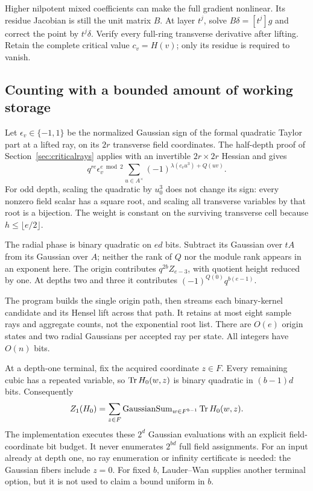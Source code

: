 Higher nilpotent mixed coefficients can make the full gradient nonlinear.
Its residue Jacobian is still the unit matrix $B$. At layer $t^j$, solve
$B\delta=[t^j]g$ and correct the point by $t^j\delta$. Verify every
full-ring transverse derivative after lifting. Retain the complete
critical value $c_v=H(v)$; only its residue is required to vanish.

\subsection{Counting with a bounded amount of working storage}
Let $\epsilon_v\in\{-1,1\}$ be the normalized Gaussian sign of the
formal quadratic Taylor part at a lifted ray, on its $2r$ transverse
field coordinates. The half-depth proof of Section~\ref{sec:criticalrays}
applies with an invertible $2r\times2r$ Hessian and gives
\[
 q^{re}\epsilon_v^{e\bmod2}
 \sum_{u\in A^\times}(-1)^{\lambda(c_vu^3)+Q(uv)}.
\]
For odd depth, scaling the quadratic by $u_0^3$ does not change its sign:
every nonzero field scalar has a square root, and scaling all transverse
variables by that root is a bijection. The weight is constant on the
surviving transverse cell because $h\le\lfloor e/2\rfloor$.

The radial phase is binary quadratic on $ed$ bits. Subtract its Gaussian
over $tA$ from its Gaussian over $A$; neither the rank of $Q$ nor the
module rank appears in an exponent here. The origin contributes
$q^{2b}Z_{e-3}$, with quotient height reduced by one. At depths two and
three it contributes $(-1)^{Q(0)}q^{b(e-1)}$.

The program builds the single origin path, then streams each binary-kernel
candidate and its Hensel lift across that path. It retains at most eight
sample rays and aggregate counts, not the exponential root list. There
are $O(e)$ origin states and two radial Gaussians per accepted ray per
state. All integers have $O(n)$ bits.

At a depth-one terminal, fix the acquired coordinate $z\in F$.
Every remaining cubic has a repeated variable, so $\operatorname{Tr} H_0(w,z)$ is
binary quadratic in $(b-1)d$ bits. Consequently
\[
 Z_1(H_0)=\sum_{z\in F}
   \operatorname{GaussianSum}_{w\in F^{b-1}}\operatorname{Tr} H_0(w,z).
\]
The implementation executes these $2^d$ Gaussian evaluations with an
explicit field-coordinate bit budget. It never enumerates $2^{bd}$ full
field assignments. For an input already at depth one, no ray enumeration
or infinity certificate is needed: the Gaussian fibers include $z=0$.
For fixed $b$, Lauder--Wan supplies another terminal option, but it is
not used to claim a bound uniform in $b$.

